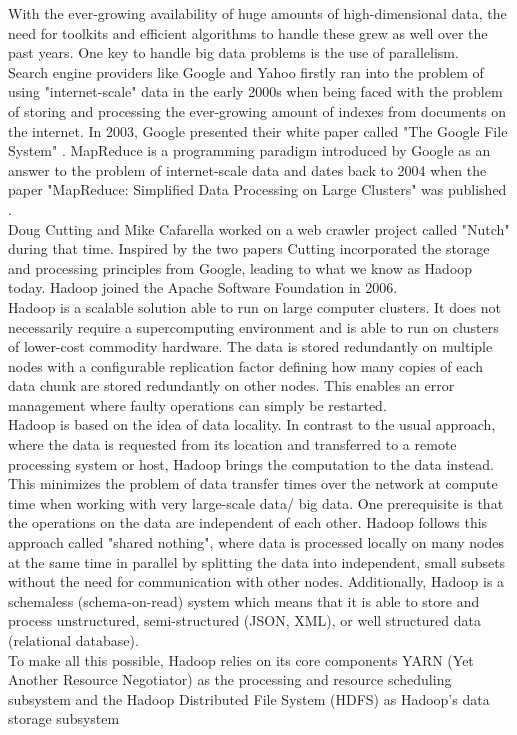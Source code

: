 With the ever-growing availability of huge amounts of high-dimensional data, the need for toolkits and efficient algorithms to handle these grew as well over the past years. One key to handle big data problems is the use of parallelism.\\
Search engine providers like Google and Yahoo firstly ran into the problem of using "internet-scale" data in the early 2000s when being faced with the problem of storing and processing the ever-growing amount of indexes from documents on the internet. In 2003, Google presented their white paper called "The Google File System" \cite{gfs}. MapReduce is a programming paradigm introduced by Google as an answer to the problem of internet-scale data and dates back to 2004 when the paper "MapReduce: Simplified Data Processing on Large Clusters" was published \cite{mapreduce1}.\\ 
Doug Cutting and Mike Cafarella worked on a web crawler project called "Nutch" during that time. Inspired by the two papers Cutting incorporated the storage and processing principles from Google, leading to what we know as Hadoop today. Hadoop joined the Apache Software Foundation in 2006. \cite[p. 6]{sparkbook1}\\ 
Hadoop is a scalable solution able to run on large computer clusters. It does not necessarily require a supercomputing environment and is able to run on clusters of lower-cost commodity hardware. The data is stored redundantly on multiple nodes with a configurable replication factor defining how many copies of each data chunk are stored redundantly on other nodes. This enables an error management where faulty operations can simply be restarted.\\
Hadoop is based on the idea of data locality. In contrast to the usual approach, where the data is requested from its location and transferred to a remote processing system or host, Hadoop brings the computation to the data instead. This minimizes the problem of data transfer times over the network at compute time when working with very large-scale data/ big data. One prerequisite is that the operations on the data are independent of each other. Hadoop follows this approach called "shared nothing", where data is processed locally on many nodes at the same time in parallel by splitting the data into independent, small subsets without the need for communication with other nodes. Additionally, Hadoop is a schemaless (schema-on-read) system which means that it is able to store and process unstructured, semi-structured (JSON, XML), or well structured data (relational database). \cite[p. 7]{sparkbook1}\\
To make all this possible, Hadoop relies on its core components YARN (Yet Another Resource Negotiator) as the processing and resource scheduling subsystem and the Hadoop Distributed File System (HDFS) as Hadoop's data storage subsystem\\

